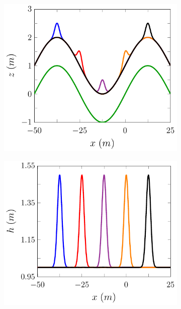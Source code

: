 \begin{figure}
	\centering
	\begin{subfigure}{0.5\textwidth}
		\includegraphics[width=\textwidth]{./chp5/figures/Forced/Wet/FEVMExw.pdf}
		\vspace{0.5cm}
	\end{subfigure}%
	\begin{subfigure}{0.5\textwidth}
		\includegraphics[width=\textwidth]{./chp5/figures/Forced/Wet/FEVMExh.pdf}

\end{subfigure}
\end{figure}
